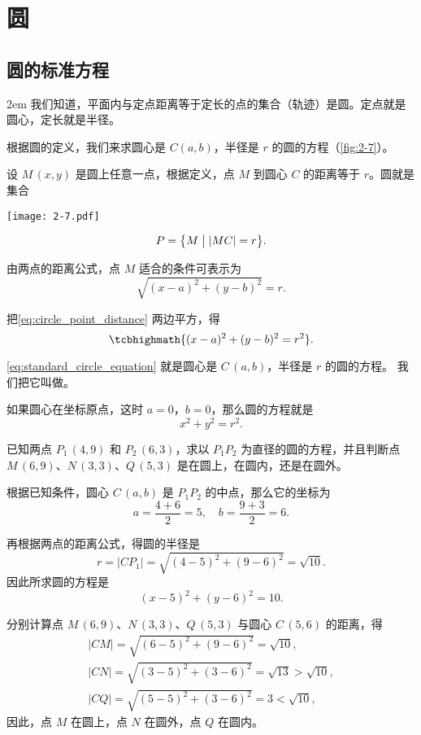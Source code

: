 \section{圆}
\subsection{圆的标准方程}
\medskip\noindent
\begin{minipage}{0.7\linewidth}\parindent2em
我们知道，平面内与定点距离等于定长的点的集合（轨迹）是圆。定点就是圆心，定长就是半径。

根据圆的定义，我们来求圆心是 $C(a,b)$，半径是 $r$ 的圆的方程（\cref{fig:2-7}）。

设 $M\,(x,y)$ 是圆上任意一点，根据定义，点 $M$ 到圆心 $C$ 的距离等于 $r$。圆就是集合
\end{minipage}\hfill
\begin{minipage}{0.25\linewidth}\centering
\begin{figurehere}
  \texttt{[image: 2-7.pdf]}
  \caption{}\label{fig:2-7}
\end{figurehere}
\end{minipage}

\[ P=\bigl\{ M \bigm\vert |MC|=r \bigr\}.\]

由两点的距离公式，点 $M$ 适合的条件可表示为
\begin{equation}
  \label{eq:circle_point_distance}
  \sqrt{(x-a)^2+(y-b)^2}=r.
\end{equation}

把\cref{eq:circle_point_distance} 两边平方，得
\begin{equation}
  \label{eq:standard_circle_equation}
  \tcbhighmath{(x-a)^2+(y-b)^2=r^2}.
\end{equation}

\cref{eq:standard_circle_equation} 就是圆心是 $C\,(a,b)$，半径是 $r$ 的圆的方程。
我们把它叫做。 

如果圆心在坐标原点，这时 $a=0$，$b=0$，那么圆的方程就是
\[ x^2+y^2=r^2.\]

\begin{example}
  已知两点 $P_1\,(4,9)$ 和 $P_2\,(6,3)$，求以 $P_1P_2$ 为直径的圆的方程，并且判断点 $M\,(6,9)$、$N\,(3,3)$、$Q\,(5,3)$ 是在圆上，在圆内，还是在圆外。
\end{example}
\begin{solution}
根据已知条件，圆心 $C\,(a,b)$ 是 $P_1P_2$ 的中点，那么它的坐标为
\[ a=\frac{4+6}{2}=5,\quad b = \frac{9+3}{2}=6.\]

再根据两点的距离公式，得圆的半径是
\[r=|CP_1|=\sqrt{(4-5)^2+(9-6)^2} =\sqrt{10}.\]
因此所求圆的方程是
\[(x-5)^2+(y-6)^2=10.\]

分别计算点 $M\,(6,9)$、$N\,(3,3)$、$Q\,(5,3)$ 与圆心 $C\,(5,6)$ 的距离，得
\begin{gather*}
  |CM|=\sqrt{(6-5)^2+(9-6)^2}=\sqrt{10},\\
  |CN|=\sqrt{(3-5)^2+(3-6)^2}=\sqrt{13}>\sqrt{10},\\
  |CQ|=\sqrt{(5-5)^2+(3-6)^2}=3<\sqrt{10},
\end{gather*}
因此，点 $M$ 在圆上，点 $N$ 在圆外，点 $Q$ 在圆内。
\end{solution}

